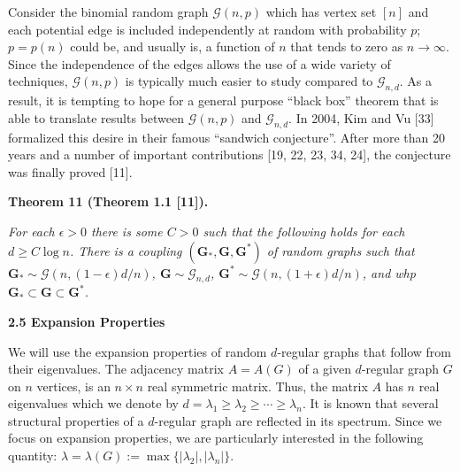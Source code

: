 \documentclass[10pt,a4paper]{article}
\begin{document}
Consider the binomial random graph $\mathcal{G}(n,p)$ which has vertex set $[n]$ and each potential edge is included independently at random with probability $p$; $p=p(n)$ could be, and usually is, a function of $n$ that tends to zero as $n\to\infty$. Since the independence of the edges allows the use of a wide variety of techniques, $\mathcal{G}(n,p)$ is typically much easier to study compared to $\mathcal{G}_{n,d}$. As a result, it is tempting to hope for a general purpose “black box” theorem that is able to translate results between $\mathcal{G}(n,p)$ and $\mathcal{G}_{n,d}$. In 2004, Kim and Vu [33] formalized this desire in their famous “sandwich conjecture”. After more than 20 years and a number of important contributions [19, 22, 23, 34, 24], the conjecture was finally proved [11].\par





\par\medskip\noindent\textbf{
\textbf{Theorem 11}\textbf{ }(Theorem 1.1 [11])\textbf{.}
}\par



\emph{For each $\epsilon>0$ there is some $C>0$ such that the following holds for each $d\geq C\log n$. There is a coupling $(\mathbf{G}_{*},\mathbf{G},\mathbf{G}^{*})$ of random graphs such that $\mathbf{G}_{*}\sim\mathcal{G}(n,(1-\epsilon)d/n)$, $\mathbf{G}\sim\mathcal{G}_{n,d}$, $\mathbf{G}^{*}\sim\mathcal{G}(n,(1+\epsilon)d/n)$, and whp $\mathbf{G}_{*}\subset\mathbf{G}\subset\mathbf{G}^{*}$.}\par







\par\medskip\noindent\textbf{
2.5 Expansion Properties}\par




We will use the expansion properties of random $d$-regular graphs that follow from their eigenvalues. The adjacency matrix $A=A(G)$
of a given $d$-regular graph $G$ on $n$ vertices, is an $n\times n$ real symmetric matrix. Thus, the matrix $A$ has $n$ real eigenvalues which we denote by $d=\lambda_{1}\geq\lambda_{2}\geq\cdots\geq\lambda_{n}$. It is known that several structural properties of a $d$-regular graph are reflected in its spectrum. Since we focus on expansion properties, we are particularly interested in the following quantity: $\lambda=\lambda(G):=\max\{|\lambda_{2}|,|\lambda_{n}|\}$.\par
\end{document}
